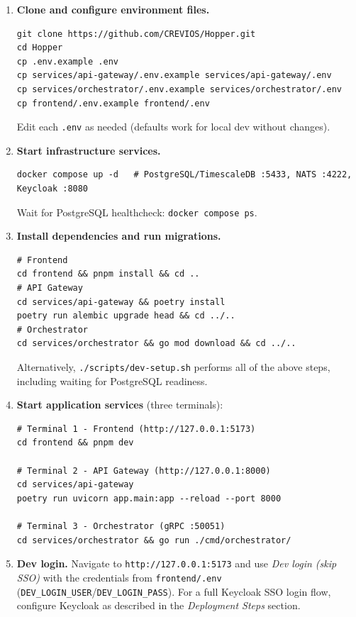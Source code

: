 \documentclass[12pt,a4paper]{article}
\begin{document}
\begin{enumerate}[leftmargin=1.5em]

  \item \textbf{Clone and configure environment files.}
\begin{lstlisting}
git clone https://github.com/CREVIOS/Hopper.git
cd Hopper
cp .env.example .env
cp services/api-gateway/.env.example services/api-gateway/.env
cp services/orchestrator/.env.example services/orchestrator/.env
cp frontend/.env.example frontend/.env
\end{lstlisting}
    Edit each \texttt{.env} as needed (defaults work for local dev without changes).

  \item \textbf{Start infrastructure services.}
\begin{lstlisting}
docker compose up -d   # PostgreSQL/TimescaleDB :5433, NATS :4222, Keycloak :8080
\end{lstlisting}
    Wait for PostgreSQL healthcheck: \texttt{docker compose ps}.

  \item \textbf{Install dependencies and run migrations.}
\begin{lstlisting}
# Frontend
cd frontend && pnpm install && cd ..
# API Gateway
cd services/api-gateway && poetry install
poetry run alembic upgrade head && cd ../..
# Orchestrator
cd services/orchestrator && go mod download && cd ../..
\end{lstlisting}
    Alternatively, \texttt{./scripts/dev-setup.sh} performs all of the
    above steps, including waiting for PostgreSQL readiness.

  \item \textbf{Start application services} (three terminals):
\begin{lstlisting}
# Terminal 1 - Frontend (http://127.0.0.1:5173)
cd frontend && pnpm dev

# Terminal 2 - API Gateway (http://127.0.0.1:8000)
cd services/api-gateway
poetry run uvicorn app.main:app --reload --port 8000

# Terminal 3 - Orchestrator (gRPC :50051)
cd services/orchestrator && go run ./cmd/orchestrator/
\end{lstlisting}

  \item \textbf{Dev login.} Navigate to \texttt{http://127.0.0.1:5173}
    and use \textit{Dev login (skip SSO)} with the credentials from
    \texttt{frontend/.env} (\texttt{DEV\_LOGIN\_USER}/\texttt{DEV\_LOGIN\_PASS}).
    For a full Keycloak SSO login flow, configure Keycloak as described in
    the \textit{Deployment Steps} section.


\end{enumerate}
\end{document}
